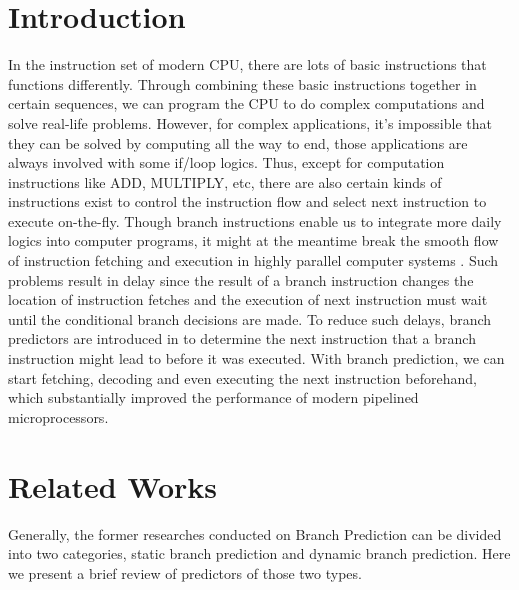\documentclass[conference]{IEEEtran}
\begin{document}
\section{Introduction}
In the instruction set of modern CPU, there are lots of basic instructions that functions differently. Through combining these basic instructions together in certain sequences, we can program the CPU to do complex computations and solve real-life problems. However, for complex applications, it's impossible that they can be solved by computing all the way to end, those applications are always involved with some if/loop logics. Thus, except for computation instructions like ADD, MULTIPLY, etc, there are also certain kinds of instructions exist to control the instruction flow and select next instruction to execute on-the-fly. Though branch instructions enable us to integrate more daily logics into computer programs, it might at the meantime break the smooth flow of instruction fetching and execution in highly parallel computer systems \cite{smith1981study}. Such problems result in delay since the result of a branch instruction changes the location of instruction fetches and the execution of next instruction must wait until the conditional branch decisions are made. To reduce such delays, branch predictors are introduced in \cite{smith1981study} to determine the next instruction that a branch instruction might lead to before it was executed. With branch prediction, we can start fetching, decoding and even executing the next instruction beforehand, which substantially improved the performance of modern pipelined microprocessors.

\section{Related Works}
Generally, the former researches conducted on Branch Prediction can be divided into two categories, static branch prediction and dynamic branch prediction. Here we present a brief review of predictors of those two types.
\end{document}
